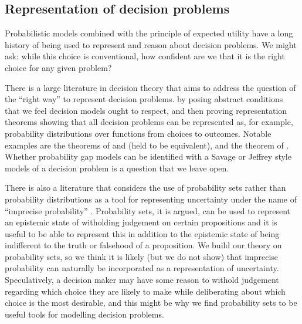 \subsection{Representation of decision problems}

Probabilistic models combined with the principle of expected utility have a long history of being used to represent and reason about decision problems. We might ask: while this choice is conventional, how confident are we that it is the right choice for any given problem?

There is a large literature in decision theory that aims to address the question of the ``right way'' to represent decision problems. by posing abstract conditions that we feel decision models ought to respect, and then proving representation theorems showing that all decision problems can be represented as, for example, probability distributions over functions from choices to outcomes. Notable examples are the theorems of \citet{ramsey_truth_2016} and \citet{savage_foundations_1954} (held to be equivalent), and the theorem of \citet{bolker_functions_1966,jeffrey_logic_1990}. Whether probability gap models can be identified with a Savage or Jeffrey style models of a decision problem is a question that we leave open.

There is also a literature that considers the use of probability sets rather than probability distributions as a tool for representing uncertainty under the name of ``imprecise probability'' \citet{bradley_imprecise_2019,walley_statistical_1991}. Probability sets, it is argued, can be used to represent an epistemic state of witholding judgement on certain propositions and it is useful to be able to represent this in addition to the epistemic state of being indifferent to the truth or falsehood of a proposition. We build our theory on probability sets, so we think it is likely (but we do not show) that imprecise probability can naturally be incorporated as a representation of uncertainty. Speculatively, a decision maker may have some reason to withold judgement regarding which choice they are likely to make while deliberating about which choice is the most desirable, and this might be why we find probability sets to be useful tools for modelling decision problems.